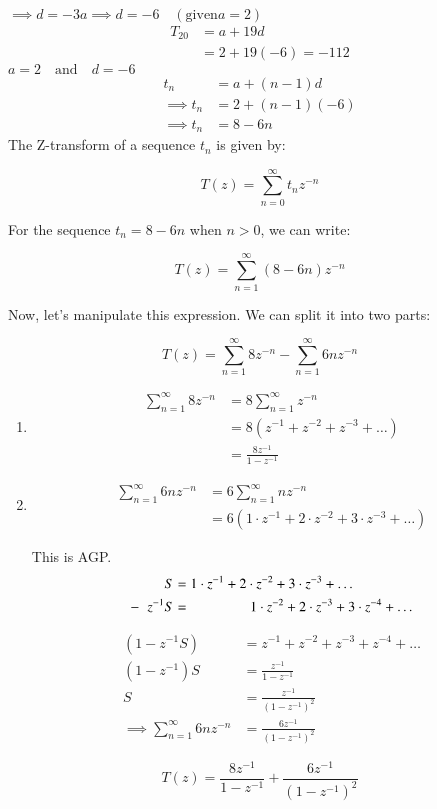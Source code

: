 \documentclass[journal,12pt,twocolumn]{IEEEtran}
\theoremstyle{remark}
\begin{document}
$\implies d = -3a \implies d = -6 \quad(\text{given}a=2)$\\
    \begin{align}
        T_{20}&=a+19d\\
        &=2+19(-6) = -112
    \end{align}
$a = 2\quad \text{and}\quad d = -6$
    \begin{align}
    t_{n}&=a+(n-1)d\\
    \implies t_{n}&=2+(n-1)(-6)\\
    \implies t_{n}&=8-6n
    \end{align}    
The Z-transform of a sequence $t_n$ is given by:

\[ T(z) = \sum_{n=0}^{\infty} t_n z^{-n} \]

For the sequence $t_n = 8 - 6n$ when $n > 0$, we can write:

\[ T(z) = \sum_{n=1}^{\infty} (8 - 6n)z^{-n} \]

Now, let's manipulate this expression. We can split it into two parts:

\[ T(z) = \sum_{n=1}^{\infty} 8z^{-n} - \sum_{n=1}^{\infty} 6nz^{-n} \]

\begin{enumerate}

    \item 
    \begin{align}\sum_{n=1}^{\infty} 8z^{-n} &= 8\sum_{n=1}^{\infty} z^{-n}\\
    &=8(z^{-1}+z^{-2}+z^{-3}+\dots)\\
    &=\frac{8z^{-1}}{1-z^{-1}}
    \end{align}
    
    \item 
    \begin{align}
    \sum_{n=1}^{\infty} 6nz^{-n} &= 6\sum_{n=1}^{\infty}nz^{-n}\\
    &=6(1\cdot z^{-1} + 2\cdot z^{-2} + 3\cdot z^{-3} + \dots)
    \end{align}
    
    This is AGP.
    \begin{align}
    S&=1\cdot z^{-1}+2\cdot z^{-2}+3\cdot z^{-3}+\dots\\
    -\hspace{2mm}z^{-1}S&=\hspace{1.5cm}1\cdot z^{-2}+2\cdot z^{-3}+3\cdot z^{-4}+\dots
    \end{align}
    
    \hrulefill

    \begin{align}
    (1-z^{-1}S)&=z^{-1}+z^{-2}+z^{-3}+z^{-4}+\dots\\
    (1-z^{-1})S&=\frac{z^{-1}}{1-z^{-1}}\\
    S&=\frac{z^{-1}}{(1-z^{-1})^{2}}\\
    \implies \sum_{n=1}^{\infty}6nz^{-n}&=\frac{6z^{-1}}{(1-z^{-1})^{2}}
    \end{align}
\end{enumerate}
\vspace{1cm}
\[T(z)=\frac{8z^{-1}}{1-z^{-1}}+\frac{6z^{-1}}{(1-z^{-1})^{2}}\]
\end{document}

